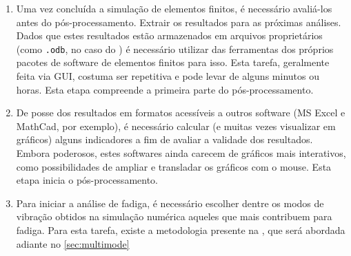 \begin{enumerate}[label=(\arabic*)]
    \item Uma vez concluída a simulação de elementos finitos, é necessário avaliá-los antes do pós-processamento. Extrair os resultados para as próximas análises. Dados que estes resultados estão armazenados em arquivos proprietários (como \texttt{.odb}, no caso do \abaqus) é necessário utilizar das ferramentas dos próprios pacotes de software de elementos finitos para isso. Esta tarefa, geralmente feita via GUI, costuma ser repetitiva e pode levar de alguns minutos ou horas. Esta etapa compreende a primeira parte do pós-processamento.
    \item De posse dos resultados em formatos acessíveis a outros software (MS Excel e MathCad, por exemplo), é necessário calcular (e muitas vezes visualizar em gráficos) alguns indicadores a fim de avaliar a validade dos resultados. Embora poderosos, estes softwares ainda carecem de gráficos mais interativos, como possibilidades de ampliar e transladar os gráficos com o mouse. Esta etapa inicia o pós-processamento.
    \item Para iniciar a análise de fadiga, é necessário escolher dentre os modos de vibração obtidos na simulação numérica aqueles que mais contribuem para fadiga. Para esta tarefa, existe a metodologia presente na , que será abordada adiante no \autoref{sec:multimode}
\end{enumerate}